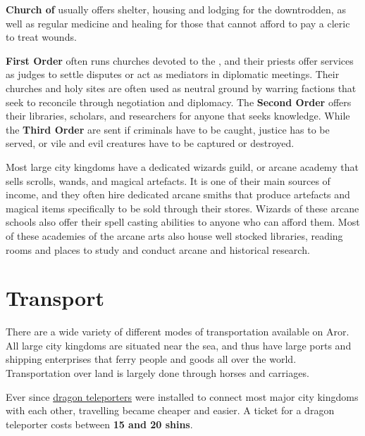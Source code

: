 \textbf{Church of } usually offers shelter, housing and
lodging for the downtrodden, as well as regular medicine and healing for those
that cannot afford to pay a cleric to treat wounds.

\textbf{First Order} often runs churches devoted to the ,
and their priests offer services as judges to settle disputes or act as
mediators in diplomatic meetings. Their churches and holy sites are often
used as neutral ground by warring factions that seek to reconcile through
negotiation and diplomacy. The \textbf{Second Order} offers their libraries,
scholars, and researchers for anyone that seeks knowledge. While the
\textbf{Third Order} are sent if criminals have to be caught, justice has to
be served, or vile and evil creatures have to be captured or destroyed.

Most large city kingdoms have a dedicated wizards guild, or arcane academy
that sells scrolls, wands, and magical artefacts. It is one of their main
sources of income, and they often hire dedicated arcane smiths that produce
artefacts and magical items specifically to be sold through their stores.
Wizards of these arcane schools also offer their spell casting abilities to
anyone who can afford them. Most of these academies of the arcane arts also
house well stocked libraries, reading rooms and places to study and conduct
arcane and historical research.

\section{Transport}
\label{sec:Transport}

There are a wide variety of different modes of transportation available on
Aror. All large city kingdoms are situated near the sea, and thus have large
ports and shipping enterprises that ferry people and goods all over the
world. Transportation over land is largely done through horses and carriages.

Ever since \hyperref[sec:Dragon Teleporter]{dragon teleporters} were installed
to connect most major city kingdoms with each other, travelling became cheaper
and easier. A ticket for a dragon teleporter costs between \textbf{15 and 20
  shins}.
